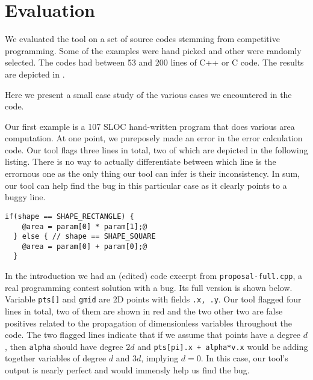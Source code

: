 \documentclass[12pt]{article}
\begin{document}
\section{Evaluation}

We evaluated the tool on a set of source codes stemming from competitive programming.
Some of the examples were hand picked and other were randomly selected.
The codes had between 53 and 200 lines of C++ or C code.
The results are depicted in .

\begin{table}[H]
  \caption{Evaluation results}
  \label{table:eval-results}
\end{table}

Here we present a small case study of the various cases we encountered in the code.

Our first example is a 107 SLOC hand-written program that does various area computation.
At one point, we pureposely made an error in the error calculation code.
Our tool flags three lines in total, two of which are depicted in the following listing.
There is no way to actually differentiate between which line is the errornous one as the
only thing our tool can infer is their inconsistency.
In sum, our tool can help find the bug in this
particular case as it clearly points to a buggy line.

\begin{lstlisting}[label=quadrilateral.c]
  if(shape == SHAPE_RECTANGLE) {
    @area = param[0] * param[1];@
  } else { // shape == SHAPE_SQUARE
    @area = param[0] + param[0];@
  }
\end{lstlisting}

In the introduction we had an (edited) code excerpt from \texttt{proposal-full.cpp},
a real programming contest solution with a bug.
Its full version is shown below.
Variable \texttt{pts[]} and \texttt{gmid} are 2D points with fields \texttt{.x, .y}.
Our tool flagged four lines in total, two of them are shown in red and the two other
two are false positives related to the propagation of dimensionless variables throughout the code.
The two flagged lines indicate that if we assume that points have a degree $d$,
then \texttt{alpha} should have degree $2d$ and \texttt{pts[pi].x + alpha*v.x} would
be adding together variables of degree $d$ and $3d$, implying $d = 0$.
In this case, our tool's output is nearly perfect and would immensly help us find the bug.
\end{document}
